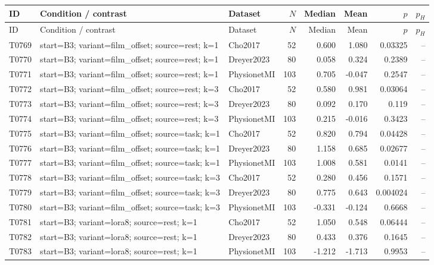 \begin{longtable}{p{.45in}p{2.6in}p{.75in}rrrrr}
\toprule
ID & Condition / contrast & Dataset & $N$ & Median & Mean & $p$ & $p_H$ \\
\midrule
\endfirsthead
\toprule
ID & Condition / contrast & Dataset & $N$ & Median & Mean & $p$ & $p_H$ \\
\midrule
\endhead
T0769 & start=B3; variant=film\_\allowbreak{}offset; source=rest; k=1 & Cho2017 & 52 & 0.600 & 1.080 & 0.03325 & -- \\
T0770 & start=B3; variant=film\_\allowbreak{}offset; source=rest; k=1 & Dreyer2023 & 80 & 0.058 & 0.324 & 0.2389 & -- \\
T0771 & start=B3; variant=film\_\allowbreak{}offset; source=rest; k=1 & PhysionetMI & 103 & 0.705 & -0.047 & 0.2547 & -- \\
T0772 & start=B3; variant=film\_\allowbreak{}offset; source=rest; k=3 & Cho2017 & 52 & 0.580 & 0.981 & 0.03064 & -- \\
T0773 & start=B3; variant=film\_\allowbreak{}offset; source=rest; k=3 & Dreyer2023 & 80 & 0.092 & 0.170 & 0.119 & -- \\
T0774 & start=B3; variant=film\_\allowbreak{}offset; source=rest; k=3 & PhysionetMI & 103 & 0.215 & -0.016 & 0.3423 & -- \\
T0775 & start=B3; variant=film\_\allowbreak{}offset; source=task; k=1 & Cho2017 & 52 & 0.820 & 0.794 & 0.04428 & -- \\
T0776 & start=B3; variant=film\_\allowbreak{}offset; source=task; k=1 & Dreyer2023 & 80 & 1.158 & 0.685 & 0.02677 & -- \\
T0777 & start=B3; variant=film\_\allowbreak{}offset; source=task; k=1 & PhysionetMI & 103 & 1.008 & 0.581 & 0.0141 & -- \\
T0778 & start=B3; variant=film\_\allowbreak{}offset; source=task; k=3 & Cho2017 & 52 & 0.280 & 0.456 & 0.1571 & -- \\
T0779 & start=B3; variant=film\_\allowbreak{}offset; source=task; k=3 & Dreyer2023 & 80 & 0.775 & 0.643 & 0.004024 & -- \\
T0780 & start=B3; variant=film\_\allowbreak{}offset; source=task; k=3 & PhysionetMI & 103 & -0.331 & -0.124 & 0.6668 & -- \\
T0781 & start=B3; variant=lora8; source=rest; k=1 & Cho2017 & 52 & 1.050 & 0.548 & 0.06444 & -- \\
T0782 & start=B3; variant=lora8; source=rest; k=1 & Dreyer2023 & 80 & 0.433 & 0.376 & 0.1645 & -- \\
T0783 & start=B3; variant=lora8; source=rest; k=1 & PhysionetMI & 103 & -1.212 & -1.713 & 0.9953 & -- \\

\end{longtable}

